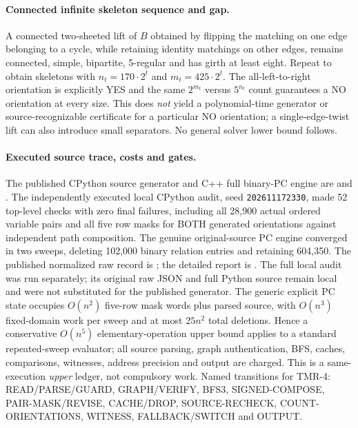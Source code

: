 \documentclass[11pt]{article}
\begin{document}
\paragraph{Connected infinite skeleton sequence and gap.}
A connected two-sheeted lift of $B$ obtained by flipping
the matching on one edge belonging to a cycle, while retaining
identity matchings on other edges, remains connected, simple,
bipartite, 5-regular and has girth at least eight.
Repeat to obtain skeletons with
$n_t=170\cdot2^t$ and $m_t=425\cdot2^t$.
The all-left-to-right orientation is explicitly YES and the
same $2^{m_t}$ versus $5^{n_t}$ count guarantees a NO orientation
at every size. This does \emph{not} yield a polynomial-time
generator or source-recognizable certificate for a particular
NO orientation; a single-edge-twist lift can also introduce
small separators. No general solver lower bound follows.

\paragraph{Executed source trace, costs and gates.}
The published CPython source generator and C++ full
binary-PC engine are
and .
The independently executed local CPython audit, seed
\texttt{202611172330}, made 52 top-level checks with
zero final failures, including all 28,900 actual ordered
variable pairs and all five row masks for BOTH generated
orientations against independent path composition.
The genuine original-source PC engine converged in two
sweeps, deleting 102,000 binary relation entries and
retaining 604,350. The published normalized raw record is
;
the detailed report is
.
The full local audit was run separately; its original raw JSON
and full Python source remain local and were not substituted
for the published generator. The generic explicit PC state
occupies $O(n^2)$ five-row mask words plus parsed source,
with $O(n^3)$ fixed-domain work per sweep and at most
$25n^2$ total deletions. Hence a conservative
$O(n^5)$ elementary-operation upper bound applies
to a standard repeated-sweep evaluator; all source parsing,
graph authentication, BFS, caches, comparisons, witnesses,
address precision and output are charged. This is a
same-execution \emph{upper} ledger, not compulsory work.
Named transitions for TMR-4:
READ/PARSE/GUARD, GRAPH/VERIFY, BFS3,
SIGNED-COMPOSE, PAIR-MASK/REVISE, CACHE/DROP,
SOURCE-RECHECK, COUNT-ORIENTATIONS, WITNESS,
FALLBACK/SWITCH and OUTPUT.
\end{document}
